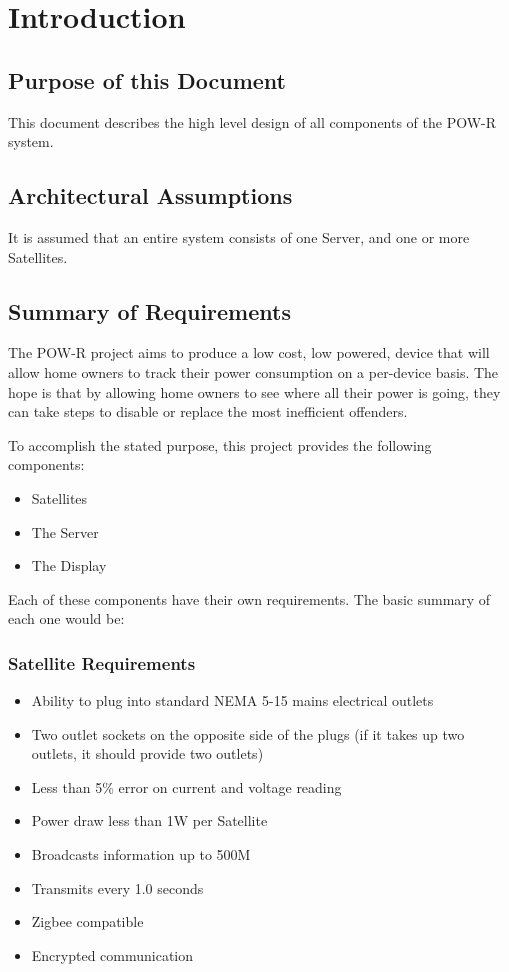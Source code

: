 \chapter{Introduction}

\section{Purpose of this Document}
This document describes the high level design of all components of the \ac{POW-R} system.

\section{Architectural Assumptions}
It is assumed that an entire system consists of one Server, and one or more Satellites.

\section{Summary of Requirements}
The POW-R project aims to produce a low cost, low powered, device that will allow home owners to track their power consumption on a per-device basis. 
The hope is that by allowing home owners to see where all their power is going, they can take steps to disable or replace the most inefficient offenders.

To accomplish the stated purpose, this project provides the following components:
\begin{itemize}
 \item Satellites
 \item The Server
 \item The Display
\end{itemize}

Each of these components have their own requirements. The basic summary of each one would be:

\subsection{Satellite Requirements}
\begin{itemize}
 \item Ability to plug into standard \ac{NEMA} 5-15 mains electrical outlets
 \item Two outlet sockets on the opposite side of the plugs (if it takes up two outlets, it should provide two outlets)
 \item Less than 5\% error on current and voltage reading
 \item Power draw less than 1\ac{W} per Satellite
 \item Broadcasts information up to 500\ac{M}
 \item Transmits every 1.0 seconds
 \item Zigbee compatible
 \item Encrypted communication
\end{itemize}

